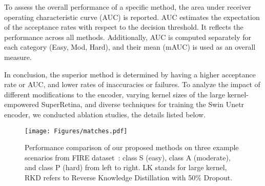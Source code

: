 \documentclass[10pt,twocolumn,letterpaper]{article}
\begin{document}
To assess the overall performance of a specific method, the area under receiver operating characteristic curve (AUC) is reported. AUC estimates the expectation of the acceptance rates with respect to the decision threshold. It reflects the performance across all methods. Additionally, AUC is computed separately for each category (Easy, Mod, Hard), and their mean (mAUC) is used as an overall measure.

In conclusion, the superior method is determined by having a higher acceptance rate or AUC, and lower rates of inaccuracies or failures.
To analyze the impact of different modifications to the encoder, varying kernel sizes of the large kernel-empowered SuperRetina, and diverse techniques for training the Swin Unetr encoder, we conducted ablation studies, the details listed below.

\begin{figure*}
  \centering
  \texttt{[image: Figures/matches.pdf]}
\vspace{-1cm}
  \caption{Performance comparison of our proposed methods on three example scenarios from FIRE dataset~\cite{hernandez2017fire}: class S (easy), class A (moderate), and class P (hard) from left to right. LK stands for large kernel, RKD refers to Reverse Knowledge Distillation with 50\% Dropout.}
  \label{matches}
\end{figure*}
\end{document}
